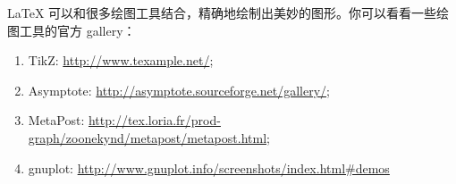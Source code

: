 \documentclass[DIV=14,fontsize=11,headinclude=false,index=totoc,footinclude=false,headings=small]{tkz-doc}
\begin{document}
\LaTeX{} 可以和很多绘图工具结合，精确地绘制出美妙的图形。你可以看看一些绘图工具的官方
gallery：
\begin{enumerate}
\item TikZ: \url{http://www.texample.net/};
\item Asymptote: \url{http://asymptote.sourceforge.net/gallery/};
\item MetaPost: \url{http://tex.loria.fr/prod-graph/zoonekynd/metapost/metapost.html};
\item gnuplot: \url{http://www.gnuplot.info/screenshots/index.html#demos}
\end{enumerate}


\begin{figure}[htbp]
  \centering
  \qquad%
  

\end{figure}
\end{document}
